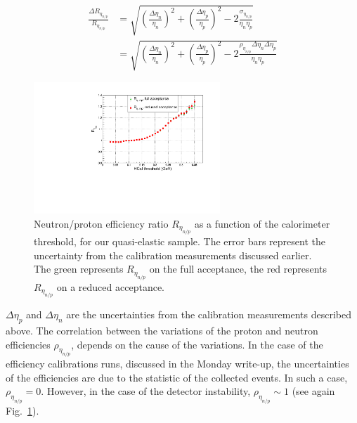 %
\begin{align}
  \frac{\Delta R_{\eta_{n/p}}}{R_{\eta_{n/p}}} &= \sqrt{ \left( \frac{\Delta \eta_{n}}{\eta_{n}} \right)^2
    + \left( \frac{\Delta \eta_{p}}{\eta_{p}} \right)^2
    - 2 \frac{\sigma_{\eta_{n/p}}}{\eta_{n}\eta_{p}} }
  \\
  &= \sqrt{ \left( \frac{\Delta \eta_{n}}{\eta_{n}} \right)^2
    + \left( \frac{\Delta \eta_{p}}{\eta_{p}} \right)^2
    - 2 \frac{\rho_{\eta_{n/p}} \Delta\eta_{n} \Delta\eta_{p}}{\eta_{n}\eta_{p}} }
  \label{eq:uncert_exact}
\end{align}
%
\begin{figure}[!h]
  \centering
  \includegraphics[width=7cm]{Answers_Readers/Reta_np_fthr_errs.pdf}
  \caption{Neutron/proton efficiency ratio $R_{\eta_{n/p}}$ as a function of the calorimeter threshold, for our quasi-elastic sample. The error bars represent the uncertainty from the calibration measurements discussed earlier. The green represents $R_{\eta_{n/p}}$ on the full acceptance, the red represents $R_{\eta_{n/p}}$ on a reduced acceptance.
  }
  \label{fig:Reta_np}
\end{figure}
%
$\Delta\eta_{p}$ and $\Delta\eta_{n}$ are the uncertainties from the calibration measurements described above.%
The correlation between the variations of the proton and neutron efficiencies $\rho_{\eta_{n/p}}$, depends on the cause of the variations.
In the case of the efficiency calibrations runs, discussed in the Monday write-up,
the uncertainties of the efficiencies are due to the statistic of the collected events. 
In such a case, $\rho_{\eta_{n/p}} = 0$.
However, in the case of the detector instability, $\rho_{\eta_{n/p}} \sim 1$ (see again Fig.~\ref{fig:Reta_np}).

